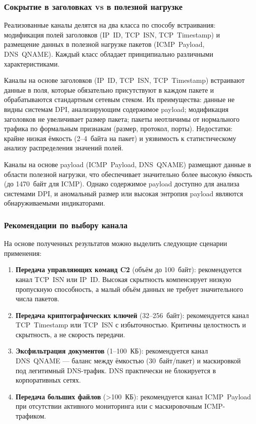 \subsubsection{Сокрытие в заголовках vs в полезной нагрузке}

Реализованные каналы делятся на два класса по способу встраивания: модификация полей заголовков (IP~ID, TCP~ISN, TCP~Timestamp) и размещение данных в полезной нагрузке пакетов (ICMP~Payload, DNS~QNAME). Каждый класс обладает принципиально различными характеристиками.

Каналы на основе заголовков (IP~ID, TCP~ISN, TCP~Timestamp) встраивают данные в поля, которые обязательно присутствуют в каждом пакете и обрабатываются стандартным сетевым стеком. Их преимущества: данные не видны системам DPI, анализирующим содержимое payload; модификация заголовков не увеличивает размер пакета; пакеты неотличимы от нормального трафика по формальным признакам (размер, протокол, порты). Недостатки: крайне низкая ёмкость (2--4~байта на пакет) и уязвимость к статистическому анализу распределения значений полей.

Каналы на основе payload (ICMP~Payload, DNS~QNAME) размещают данные в области полезной нагрузки, что обеспечивает значительно более высокую ёмкость (до 1470~байт для ICMP). Однако содержимое payload доступно для анализа системами DPI, и аномальный размер или высокая энтропия payload являются обнаруживаемыми индикаторами.

\subsubsection{Рекомендации по выбору канала}

На основе полученных результатов можно выделить следующие сценарии применения:

\begin{enumerate}[label=\arabic*)]
    \item \textbf{Передача управляющих команд C2} (объём до 100~байт): рекомендуется канал TCP~ISN или IP~ID. Высокая скрытность компенсирует низкую пропускную способность, а малый объём данных не требует значительного числа пакетов.
    \item \textbf{Передача криптографических ключей} (32--256~байт): рекомендуется канал TCP~Timestamp или TCP~ISN с избыточностью. Критичны целостность и скрытность, а не скорость передачи.
    \item \textbf{Эксфильтрация документов} (1--100~КБ): рекомендуется канал DNS~QNAME --- баланс между ёмкостью (30~байт/пакет) и маскировкой под легитимный DNS-трафик. DNS практически не блокируется в корпоративных сетях.
    \item \textbf{Передача больших файлов} ({>}100~КБ): рекомендуется канал ICMP~Payload при отсутствии активного мониторинга или с маскировочным ICMP-трафиком.
\end{enumerate}

